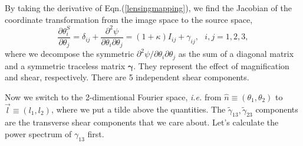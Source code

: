 \documentclass[aps,prd,twocolumn,floatfix,showpacs,superscriptaddress,nofootinbib]{revtex4-1}
\newcommand{\ie}{{\it i.e. }}
\begin{document}
By taking the derivative of Eqn.(\ref{lensingmapping}), we find the Jacobian of the coordinate transformation from the image space to the source space,
\begin{equation}
\frac{\partial\theta_i^S}{\partial\theta_j}=\delta_{ij}+\frac{\partial^2\psi}{\partial\theta_i\partial\theta_j}=(1+\kappa)I_{ij}+\gamma_{ij},\ \ \ i,j=1,2,3,
\label{lensingtsf}
\end{equation}
where we decompose the symmetric $\partial^2\psi/\partial\theta_i\partial\theta_j$ as the sum of a diagonal matrix and a symmetric traceless matrix $\bm{\gamma}$. They represent the effect of magnification and shear, respectively. There are 5 independent shear components.

Now we switch to the 2-dimentional Fourier space, \ie from $\hat{n}\equiv(\theta_1,\theta_2)$ to $\vec{l}\equiv(l_1,l_2)$, where we put a tilde above the quantities. The $\tilde{\gamma}_{13},\tilde{\gamma}_{23}$ components are the transverse shear components that we care about. Let's calculate the power spectrum of $\gamma_{13}$ first.
\end{document}
